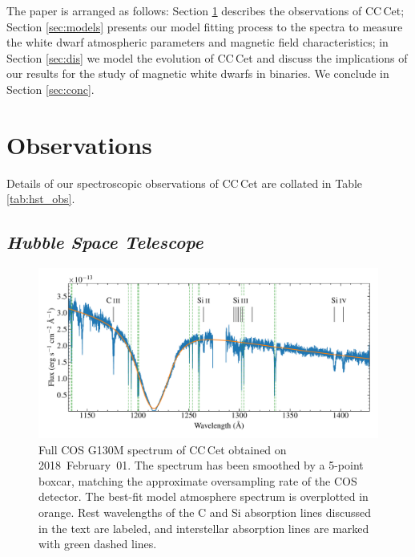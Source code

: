 \documentclass[fleqn,usenatbib]{mnras}
\begin{document}
The paper is arranged as follows: Section \ref{sec:obs} describes the observations of CC\,Cet; Section \ref{sec:models} presents our model fitting process to the spectra to measure the white dwarf atmospheric parameters and magnetic field characteristics; in Section \ref{sec:dis} we model the evolution of CC\,Cet and discuss the implications of our results for the study of magnetic white dwarfs in binaries. We conclude in Section \ref{sec:conc}.  


\section{Observations}
\label{sec:obs}
Details of our spectroscopic observations of CC\,Cet are collated in Table \ref{tab:hst_obs}.

\subsection{\textit{Hubble Space Telescope}}

\begin{figure}
    \centering
    \includegraphics[width=2\columnwidth]{cc_cet_cos.pdf}
    \caption{Full COS G130M spectrum of CC\,Cet obtained on 2018~February~01. The spectrum has been smoothed by a 5-point boxcar, matching the approximate oversampling rate of the COS detector. The best-fit model atmosphere spectrum is overplotted in orange. Rest wavelengths of the C and Si absorption lines discussed in the text are labeled, and interstellar absorption lines are marked with green dashed lines.}
    \label{fig:cos_spec}
\end{figure}
\end{document}
